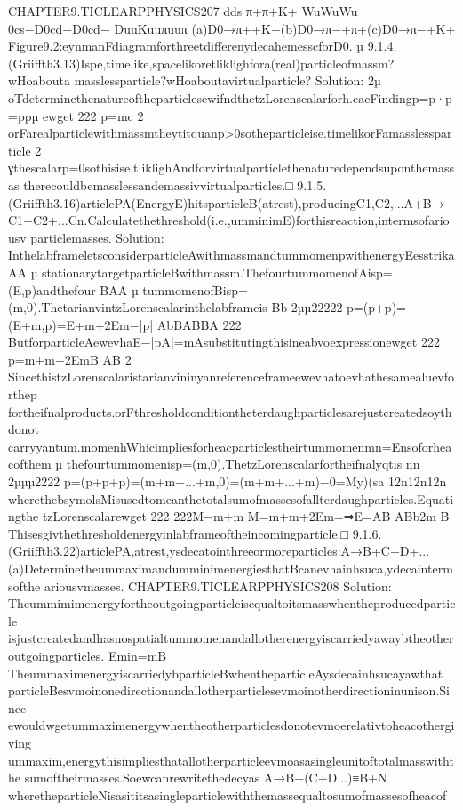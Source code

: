 {{{{{{{{{{{CHAPTER9.TICLEARPPHYSICS207
dds
π+π+K+
WuWuWu
0cs−D0cd−D0cd−
DuuKuuπuuπ
(a)D0→π++K−(b)D0→π−+π+(c)D0→π−+K+
Figure9.2:eynmanFdiagramforthreetdifferenydecahemesscforD0.
µ
9.1.4.(Griiffth3.13)Ispe,timelike,spacelikoretliklighfora(real)particleofmassm?wHoabouta
masslessparticle?wHoaboutavirtualparticle?
Solution:
2µ
oTdeterminethenatureoftheparticlesewifndthetzLorenscalarforh.eacFindingp=p·p=ppµ
ewget
222
p=mc
2
orFarealparticlewithmassmtheytitquanp>0sotheparticleise.timelikorFamasslessparticle
2
γthescalarp=0sothisise.tliklighAndforvirtualparticlethenaturedependsuponthemassas
therecouldbemasslessandemassivvirtualparticles.□
9.1.5.(Griiffth3.16)articlePA(EnergyE)hitsparticleB(atrest),producingC1,C2,...A+B→
C1+C2+...Cn.Calculatethethreshold(i.e.,umminimE)forthisreaction,intermsofariousv
particlemasses.
Solution:
InthelabframeletsconsiderparticleAwithmassmandtummomenpwithenergyEesstrika
AA
µ
stationarytargetparticleBwithmassm.ThefourtummomenofAisp=(E,p)andthefour
BAA
µ
tummomenofBisp=(m,0).ThetarianvintzLorenscalarinthelabframeis
Bb
2µµ22222
p=(p+p)=(E+m,p)=E+m+2Em−|p|
AbBABBA
222
ButforparticleAewevhaE−|pA|=mAsubstitutingthisineabvoexpressionewget
222
p=m+m+2EmB
AB
2
SincethistzLorenscalaristarianvininyanreferenceframeewevhatoevhathesamealuevforthep
fortheifnalproducts.orFthresholdconditiontheterdaughparticlesarejustcreatedsoythdonot
carryyantum.momenhWhicimpliesforheacparticlestheirtummomenmn=Ensoforheacofthem
µ
thefourtummomenisp=(m,0).ThetzLorenscalarfortheifnalyqtis
nn
2µµµ2222
p=(p+p+p)=(m+m+...+m,0)=(m+m+...+m)−0=My)(sa
12n12n12n
wherethebsymolsMisusedtomeanthetotalsumofmassesofallterdaughparticles.Equatingthe
tzLorenscalarewget
222
222M−m+m
M=m+m+2Em=⇒E=AB
ABb2m
B
Thisesgivthethresholdenergyinlabframeoftheincomingparticle.□
9.1.6.(Griiffth3.22)articlePA,atrest,ysdecatointhreeormoreparticles:A→B+C+D+...
(a)DeterminetheummaximandumminimenergiesthatBcanevhainhsuca,ydecaintermsofthe
ariousvmasses.
CHAPTER9.TICLEARPPHYSICS208
Solution:
Theummimimenergyfortheoutgoingparticleisequaltoitsmasswhentheproducedparticle
isjustcreatedandhasnospatialtummomenandallotherenergyiscarriedyawaybtheother
outgoingparticles.
Emin=mB
TheummaximenergyiscarriedybparticleBwhentheparticleAysdecainhsucayawthat
particleBesvmoinonedirectionandallotherparticlesevmoinotherdirectioninunison.Since
ewouldwgetummaximenergywhentheotherparticlesdonotevmoerelativtoheacothergiving
ummaxim,energythisimpliesthatallotherparticleevmoasasingleunitoftotalmasswiththe
sumoftheirmasses.Soewcanrewritethedecyas
A→B+(C+D...)≡B+N
wheretheparticleNisasititsasingleparticlewiththemassequaltosumofmassesofheacof
}}}}}}}}}}}
